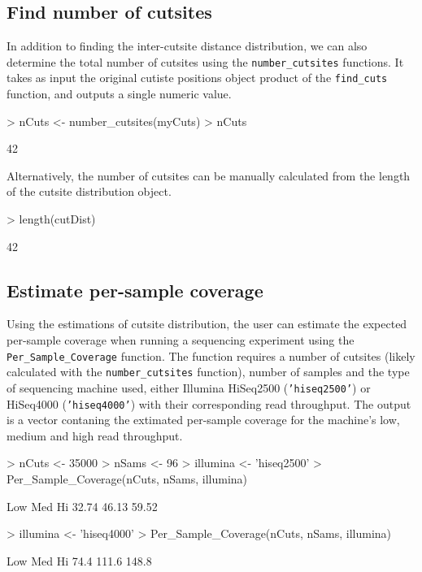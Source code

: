 \documentclass{article}
\begin{document}
\subsection{Find number of cutsites}
In addition to finding the inter-cutsite distance distribution, we can also determine the total number of cutsites using the \texttt{number\_cutsites} functions. It takes as input the original cutiste positions object product of the \texttt{find\_cuts} function, and outputs a single numeric value.
\begin{Schunk}
\begin{Sinput}
> nCuts <- number_cutsites(myCuts)
> nCuts
\end{Sinput}
\begin{Soutput}
[1] 42
\end{Soutput}
\end{Schunk}
Alternatively, the number of cutsites can be manually calculated from the length of the cutsite distribution object.
\begin{Schunk}
\begin{Sinput}
> length(cutDist)
\end{Sinput}
\begin{Soutput}
[1] 42
\end{Soutput}
\end{Schunk}

\subsection{Estimate per-sample coverage}
Using the estimations of cutsite distribution, the user can estimate the expected per-sample coverage when running a sequencing experiment using the \texttt{Per\_Sample\_Coverage} function. The function requires a number of cutsites (likely calculated with the \texttt{number\_cutsites} function), number of samples and the type of sequencing machine used, either Illumina HiSeq2500 (\texttt{'hiseq2500'}) or HiSeq4000 (\texttt{'hiseq4000'}) with their corresponding read throughput. The output is a vector contaning the extimated per-sample coverage for the machine's low, medium and high read throughput. 
\begin{Schunk}
\begin{Sinput}
> nCuts <- 35000
> nSams <- 96
> illumina <- 'hiseq2500'
> Per_Sample_Coverage(nCuts, nSams, illumina)
\end{Sinput}
\begin{Soutput}
  Low   Med    Hi 
32.74 46.13 59.52 
\end{Soutput}
\begin{Sinput}
> illumina <- 'hiseq4000'
> Per_Sample_Coverage(nCuts, nSams, illumina)
\end{Sinput}
\begin{Soutput}
  Low   Med    Hi 
 74.4 111.6 148.8 
\end{Soutput}
\end{Schunk}
\end{document}
